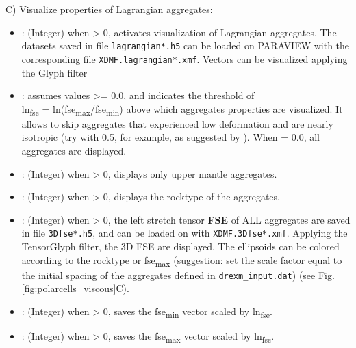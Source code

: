 C) Visualize properties of Lagrangian aggregates:
\begin{itemize}
    
    \item {}: (Integer) when > 0, activates visualization of Lagrangian aggregates. The datasets saved in file \texttt{lagrangian*.h5} can be loaded on PARAVIEW with the corresponding file \texttt{XDMF.lagrangian*.xmf}. Vectors can be visualized applying the Glyph filter
	
	\item {}: assumes values >= 0.0, and indicates the threshold of\\ ln\textsubscript{fse} = ln(fse\textsubscript{max}/fse\textsubscript{min}) above which aggregates properties are visualized. It allows to skip aggregates that experienced low deformation and are nearly isotropic (try with 0.5, for example, as suggested by \citet{becker2006epsl}). When  = 0.0, all aggregates are displayed.
	
	\item {}: (Integer) when > 0, displays only upper mantle aggregates.
	
	\item {}: (Integer) when > 0, displays the rocktype of the aggregates.
	
	\item {}\footnotemark: (Integer) when > 0, the left stretch tensor \textbf{FSE} of ALL aggregates are saved in file \texttt{3Dfse*.h5}, and can be loaded on \paraviewtitle{} with \texttt{XDMF.3Dfse*.xmf}. Applying the TensorGlyph filter, the 3D FSE are displayed. The ellipsoids can be colored according to the rocktype or fse\textsubscript{max} (suggestion: set the scale factor equal to the initial spacing of the aggregates defined in \texttt{drexm\_input.dat}) (see Fig. \ref{fig:polarcells_viscous}C).
	
	\item {}: (Integer) when > 0, saves the fse\textsubscript{min} vector scaled by ln\textsubscript{fse}.
	
	\item {}: (Integer) when > 0, saves the fse\textsubscript{max} vector scaled by ln\textsubscript{fse}.
	
\end{itemize}


